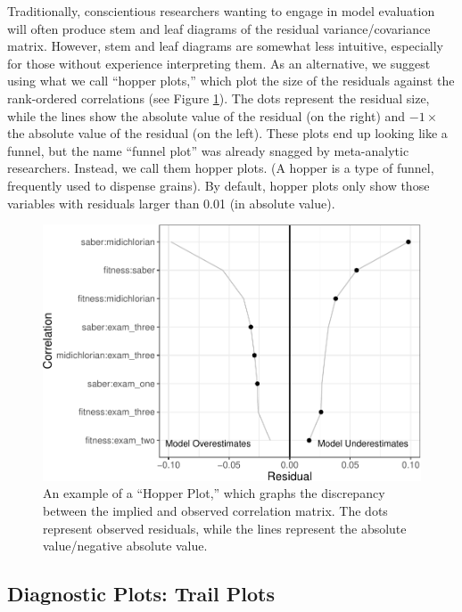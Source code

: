 \documentclass[
  english,
  doc]{apa6}
\begin{document}
Traditionally, conscientious researchers wanting to engage in model evaluation will often produce stem and leaf diagrams of the residual variance/covariance matrix. However, stem and leaf diagrams are somewhat less intuitive, especially for those without experience interpreting them. As an alternative, we suggest using what we call ``hopper plots,'' which plot the size of the residuals against the rank-ordered correlations (see Figure \ref{fig:hopper}). The dots represent the residual size, while the lines show the absolute value of the residual (on the right) and \(-1\times\) the absolute value of the residual (on the left). These plots end up looking like a funnel, but the name ``funnel plot'' was already snagged by meta-analytic researchers. Instead, we call them hopper plots. (A hopper is a type of funnel, frequently used to dispense grains). By default, hopper plots only show those variables with residuals larger than 0.01 (in absolute value).

\begin{figure}
\centering
\includegraphics{flexplavaan_draft_files/figure-latex/hopper-1.pdf}
\caption{\label{fig:hopper}An example of a ``Hopper Plot,'' which graphs the discrepancy between the implied and observed correlation matrix. The dots represent observed residuals, while the lines represent the absolute value/negative absolute value.}
\end{figure}

\hypertarget{diagnostic-plots-trail-plots}{%
\subsection{Diagnostic Plots: Trail Plots}\label{diagnostic-plots-trail-plots}}
\end{document}
